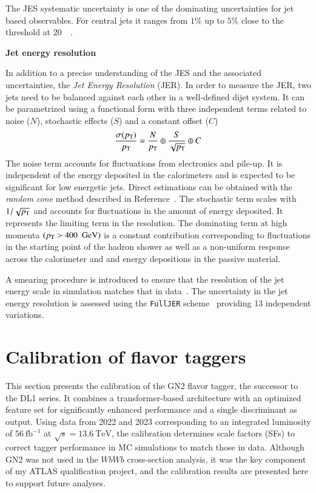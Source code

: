 The JES systematic uncertainty is one of the dominating uncertainties for jet based observables.
For central jets it ranges from $1\%$ up to $5\%$ close to the \pt threshold at 20~\GeV~\cite{JETM-2018-05}. 


\vspace{.5cm}
\noindent
\textbf{Jet energy resolution}
\vspace{.5cm}

\noindent
In addition to a precise understanding of the JES and the associated uncertainties, 
the \textit{Jet Energy Resolution} (JER).
In order to measure the JER, two jets need to be balanced against each other in a well-defined dijet system. It can be parametrized using a functional form with three independent terms  related to noise ($N$), stochastic effects ($S$) and a constant offset ($C$)~\cite{JETM-2018-05}
\begin{equation}
    \frac{\sigma(p_{\text{T}})}{p_{\text{T}}} = \frac{N}{p_{\text{T}}} \oplus \frac{S}{\sqrt{p_{\text{T}}}} \oplus C
\end{equation}
The noise term accounts for fluctuations from electronics and pile-up.
It is independent of the energy deposited in the calorimeters and is expected to be significant for low energetic jets. Direct estimations can be obtained with the \textit{random cone} method described in Reference~\cite{JETM-2018-05}.
The stochastic term scales with $1/\sqrt{p_{\text{T}}}$ and accounts for fluctuations in the amount of energy deposited. It represents the limiting term in the resolution.
The dominating term at high momenta $(p_{\text{T}} > 400~~\text{GeV})$ is a constant contribution corresponding
to fluctuations in the starting point of the hadron shower as well as a non-uniform response
across the calorimeter and and energy depositions in the passive material.

A smearing procedure is introduced to ensure that the resolution of the jet energy scale in simulation matches that in data~\cite{JETM-2018-05}.
The uncertainty in the jet energy resolution is assessed using the \verb|FullJER| scheme~\cite{web:JetSystematics} providing 13 independent variations.



\section{Calibration of flavor taggers}
\label{sec:calib:ftag}

This section presents the calibration of the GN2 flavor tagger, the successor to the DL1 series.
It combines a transformer-based architecture with an optimized feature set for significantly enhanced performance and a single discriminant as output.
Using data from 2022 and 2023 corresponding to an integrated luminosity of $56~\text{fb}^{-1}$
at $\sqrt{s} = 13.6~\text{TeV}$, the calibration determines scale factors (SFs) to correct tagger performance in MC simulations to match those in data.
Although GN2 was not used in the $WbWb$ cross-section analysis, it was the key component of my ATLAS qualification project,
and the calibration results are presented here to support future analyses.


